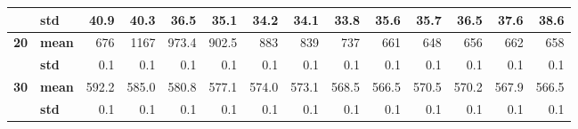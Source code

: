 \begin{table}[htbp]
\begin{tabular}{|c|l|r|r|r|r|r|r|r|r|r|r|r|r|}
\cline{2-14}    \rowcolor[rgb]{ .553,  .706,  .886}      & \textbf{std} & \cellcolor[rgb]{ .851,  .851,  .851} 40.9 & \cellcolor[rgb]{ .851,  .851,  .851} 40.3 & \cellcolor[rgb]{ .851,  .851,  .851} 36.5 & \cellcolor[rgb]{ .851,  .851,  .851} 35.1 & \cellcolor[rgb]{ .851,  .851,  .851} 34.2 & \cellcolor[rgb]{ .851,  .851,  .851} 34.1 & \cellcolor[rgb]{ .851,  .851,  .851} 33.8 & \cellcolor[rgb]{ .851,  .851,  .851} 35.6 & \cellcolor[rgb]{ .851,  .851,  .851} 35.7 & \cellcolor[rgb]{ .851,  .851,  .851} 36.5 & \cellcolor[rgb]{ .851,  .851,  .851} 37.6 & \cellcolor[rgb]{ .851,  .851,  .851} 38.6 \bigstrut\\
    \hline
    \rowcolor[rgb]{ .553,  .706,  .886} \textbf{20} & \textbf{mean} & \cellcolor[rgb]{ 1,  1,  1} 676 & \cellcolor[rgb]{ 1,  1,  1} 1167 & \cellcolor[rgb]{ 1,  1,  1} 973.4 & \cellcolor[rgb]{ 1,  1,  1} 902.5 & \cellcolor[rgb]{ 1,  1,  1} 883 & \cellcolor[rgb]{ 1,  1,  1} 839 & \cellcolor[rgb]{ 1,  1,  1} 737 & \cellcolor[rgb]{ 1,  1,  1} 661 & \cellcolor[rgb]{ 1,  1,  1} 648 & \cellcolor[rgb]{ 1,  1,  1} 656 & \cellcolor[rgb]{ 1,  1,  1} 662 & \cellcolor[rgb]{ 1,  1,  1} 658 \bigstrut\\
\cline{2-14}    \rowcolor[rgb]{ .553,  .706,  .886}      & \textbf{std} & \cellcolor[rgb]{ 1,  1,  1} 0.1 & \cellcolor[rgb]{ 1,  1,  1} 0.1 & \cellcolor[rgb]{ 1,  1,  1} 0.1 & \cellcolor[rgb]{ 1,  1,  1} 0.1 & \cellcolor[rgb]{ 1,  1,  1} 0.1 & \cellcolor[rgb]{ 1,  1,  1} 0.1 & \cellcolor[rgb]{ 1,  1,  1} 0.1 & \cellcolor[rgb]{ 1,  1,  1} 0.1 & \cellcolor[rgb]{ 1,  1,  1} 0.1 & \cellcolor[rgb]{ 1,  1,  1} 0.1 & \cellcolor[rgb]{ 1,  1,  1} 0.1 & \cellcolor[rgb]{ 1,  1,  1} 0.1 \bigstrut\\
    \hline
    \rowcolor[rgb]{ .553,  .706,  .886} \textbf{30} & \textbf{mean} & \cellcolor[rgb]{ .851,  .851,  .851} 592.2 & \cellcolor[rgb]{ .851,  .851,  .851} 585.0 & \cellcolor[rgb]{ .851,  .851,  .851} 580.8 & \cellcolor[rgb]{ .851,  .851,  .851} 577.1 & \cellcolor[rgb]{ .851,  .851,  .851} 574.0 & \cellcolor[rgb]{ .851,  .851,  .851} 573.1 & \cellcolor[rgb]{ .851,  .851,  .851} 568.5 & \cellcolor[rgb]{ .851,  .851,  .851} 566.5 & \cellcolor[rgb]{ .851,  .851,  .851} 570.5 & \cellcolor[rgb]{ .851,  .851,  .851} 570.2 & \cellcolor[rgb]{ .851,  .851,  .851} 567.9 & \cellcolor[rgb]{ .851,  .851,  .851} 566.5 \bigstrut\\
\cline{2-14}    \rowcolor[rgb]{ .553,  .706,  .886}      & \textbf{std} & \cellcolor[rgb]{ .851,  .851,  .851} 0.1 & \cellcolor[rgb]{ .851,  .851,  .851} 0.1 & \cellcolor[rgb]{ .851,  .851,  .851} 0.1 & \cellcolor[rgb]{ .851,  .851,  .851} 0.1 & \cellcolor[rgb]{ .851,  .851,  .851} 0.1 & \cellcolor[rgb]{ .851,  .851,  .851} 0.1 & \cellcolor[rgb]{ .851,  .851,  .851} 0.1 & \cellcolor[rgb]{ .851,  .851,  .851} 0.1 & \cellcolor[rgb]{ .851,  .851,  .851} 0.1 & \cellcolor[rgb]{ .851,  .851,  .851} 0.1 & \cellcolor[rgb]{ .851,  .851,  .851} 0.1 & \cellcolor[rgb]{ .851,  .851,  .851} 0.1 \bigstrut\\

\end{tabular}
\end{table}
